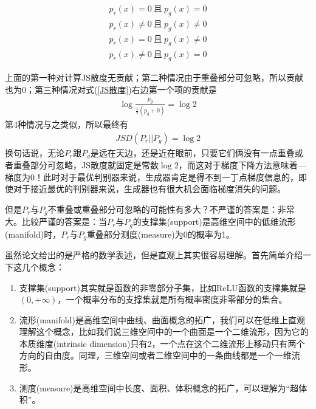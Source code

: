             \begin{align*}
            p_r(x) = 0 \ \text{且} \ p_g(x) = 0\\
            p_r(x) \neq 0 \ \text{且} \ p_g(x) \neq 0\\
            p_r(x) = 0 \ \text{且} \ p_g(x) \neq 0\\
            p_r(x) \neq 0 \ \text{且} \ p_g(x) = 0
            \end{align*}
            \par
            上面的第一种对计算JS散度无贡献；第二种情况由于重叠部分可忽略，所以贡献也为0；第三种情况对式(\ref{JS散度})右边第一个项的贡献是
            \begin{align*}
            \log \frac{p_g}{\frac{1}{2}(p_g+0)} = \log 2
            \end{align*}
            第4种情况与之类似，所以最终有
            \begin{align*}
            JSD(P_r||P_g) = \log 2
            \end{align*}
            换句话说，无论$ P_r $跟$ P_g $是远在天边，还是近在眼前，只要它们俩没有一点重叠或者重叠部分可忽略，JS散度就固定是常数$\log 2$，而这对于梯度下降方法意味着—梯度为0！此时对于最优判别器来说，生成器肯定是得不到一丁点梯度信息的，即使对于接近最优的判别器来说，生成器也有很大机会面临梯度消失的问题。
            \par
            但是$ P_r $与$ P_g $不重叠或重叠部分可忽略的可能性有多大？不严谨的答案是：非常大。比较严谨的答案是：当$ P_r $与$ P_g $的支撑集(support)是高维空间中的低维流形(manifold)时，$P_r $与$ P_g $重叠部分测度(measure)为0的概率为1。
            \par
            虽然论文给出的是严格的数学表述，但是直观上其实很容易理解。首先简单介绍一下这几个概念：
            \begin{enumerate}
            \item 支撑集(support)其实就是函数的非零部分子集，比如ReLU函数的支撑集就是$(0,+\infty)$，一个概率分布的支撑集就是所有概率密度非零部分的集合。
            \item 流形(manifold)是高维空间中曲线、曲面概念的拓广，我们可以在低维上直观理解这个概念，比如我们说三维空间中的一个曲面是一个二维流形，因为它的本质维度(intrinsic dimension)只有2，一个点在这个二维流形上移动只有两个方向的自由度。同理，三维空间或者二维空间中的一条曲线都是一个一维流形。
            \item 测度(measure)是高维空间中长度、面积、体积概念的拓广，可以理解为“超体积”。
            \end{enumerate}
